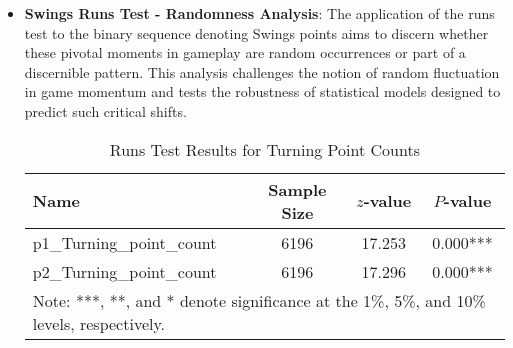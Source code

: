 \documentclass{mcmthesis}
\begin{document}
\begin{itemize}
\item {\bf Swings Runs Test - Randomness Analysis}: The application of the runs test to the binary sequence denoting Swings points aims to discern whether these pivotal moments in gameplay are random occurrences or part of a discernible pattern. This analysis challenges the notion of random fluctuation in game momentum and tests the robustness of statistical models designed to predict such critical shifts.
\begin{table}[ht]
    \centering
    \caption{Runs Test Results for Turning Point Counts}
    \label{tab:runs_test_turning_points}
    \begin{tabular}{lccc}
        \hline
        Name                      & Sample Size & \(z\)-value & \(P\)-value                                                        \\ \hline
        p1\_Turning\_point\_count & 6196        & 17.253      & 0.000***                                                           \\
        p2\_Turning\_point\_count & 6196        & 17.296      & 0.000***                                                           \\ \hline
        \multicolumn{4}{l}{\footnotesize Note: ***, **, and * denote significance at the 1\%, 5\%, and 10\% levels, respectively.} \\
    \end{tabular}
\end{table}
\end{itemize}
\end{document}
